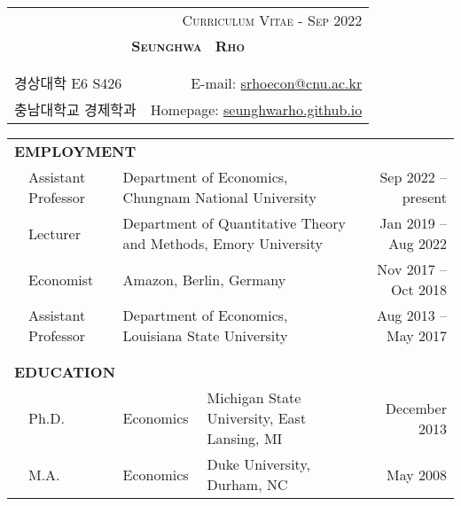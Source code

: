 \documentclass[10pt]{article}
\begin{document}
\begin{center}
\begin{tabular}{lr}
& \textsc{Curriculum Vitae - Sep 2022} \\
\multicolumn{2}{c}{{\Large \textsc{\textbf{Seunghwa \ Rho }}}}\\ 
\multicolumn{2}{p{510pt}}{}\\
\hline\\
경상대학 E6 S426 & E-mail: \href{mailto:srhoecon@cnu.ac.kr}{srhoecon@cnu.ac.kr} \\
\multicolumn{1}{l}{충남대학교 경제학과}& Homepage: \href{https://seunghwarho.github.io}{seunghwarho.github.io}
\end{tabular}

\bigskip \bigskip 
\begin{tabular}{llllr}
\multicolumn{5}{l}{{\Large \textbf{E}}\textbf{MPLOYMENT}} \vspace{0.1cm}\\
&\multicolumn{1}{l}{Assistant Professor} & \multicolumn{2}{l}{Department of Economics, Chungnam National University}& \multicolumn{1}{r}{Sep 2022 -- present}\vspace{0.1cm} \\
&\multicolumn{1}{l}{Lecturer} & \multicolumn{2}{l}{Department of Quantitative Theory and Methods, Emory University}& \multicolumn{1}{r}{Jan 2019 -- Aug 2022}\vspace{0.1cm} \\
&\multicolumn{1}{l}{Economist} & \multicolumn{2}{l}{Amazon, Berlin, Germany}& \multicolumn{1}{r}{Nov 2017 -- Oct 2018}\vspace{0.1cm} \\
&\multicolumn{1}{l}{Assistant Professor} &\multicolumn{2}{l}{Department of Economics, Louisiana State University}& \multicolumn{1}{r}{Aug 2013 -- May 2017} \\
\multicolumn{5}{p{500pt}}{}\\\\
\multicolumn{5}{l}{{\Large \textbf{E}}\textbf{DUCATION}} \vspace{0.1cm}\\
&\multicolumn{1}{l}{Ph.D.} & \multicolumn{1}{l}{Economics}&\multicolumn{1}{l}{Michigan State University, East Lansing, MI}& \multicolumn{1}{r}{December 2013} \\
&\multicolumn{1}{l}{M.A.} & \multicolumn{1}{l}{Economics}& \multicolumn{1}{l}{Duke University, Durham, NC} & \multicolumn{1}{r}{May 2008} \\

\end{tabular}
\end{center}
\end{document}
